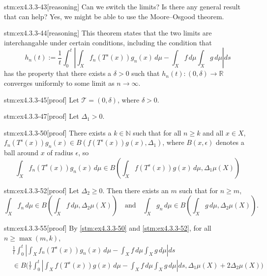 \begin{stm}{stm:ex4.3.3-43}[reasoning]
Can we switch the limits? Is there any general result that can help? Yes, we might be able to use the Moore–Osgood theorem.
\end{stm}

\begin{stm}{stm:ex4.3.3-44}[reasoning]
This theorem states that the two limits are interchangable under certain conditions, including the condition that
$$
h_n(t) := \frac{1}{t} \int_0^t 
\left| \int_X f_n(T^s(x)) g_n(x) \, d\mu 
- \int_X f \, d\mu \int_X g \, d\mu \right| ds
$$
has the property that there exists a $\delta > 0$ such that $h_n(t): (0,\delta) \rightarrow \mathbb{R}$ converges uniformly to some limit as $n \rightarrow \infty$.
\end{stm}

\begin{stm}{stm:ex4.3.3-45}[proof]
Let $\mathcal{T} = (0,\delta)$, where $\delta > 0$.
\end{stm}

\begin{stm}{stm:ex4.3.3-47}[proof]
Let $\Delta_1 > 0$.
\end{stm}

\begin{stm}{stm:ex4.3.3-50}[proof]
There exists a $ k \in \mathbb{N}$ such that for all $ n \geq k $ and all $x \in X$, $f_n(T^s(x)) g_n(x) \in B(f(T^s(x)) g(x), \Delta_1)$, where $B(x,\epsilon)$ denotes a ball around $x$ of radius $\epsilon$, so
\[
\int_X f_n(T^s(x)) g_n(x) \, d\mu 
\in B \left( \int_X f(T^s(x)) g(x) \, d\mu, \Delta_1 \mu(X) \right)
\]
\end{stm}

\begin{stm}{stm:ex4.3.3-52}[proof]
Let $\Delta_2 \geq 0$. Then there exists an $m$ such that for $n \geq m$,
\[
\int_X f_n \, d\mu \in B \left( \int_X f \, d\mu, \Delta_2 \mu(X) \right)
\quad \text{and} \quad 
\int_X g_n \, d\mu \in B \left( \int_X g \, d\mu, \Delta_2 \mu(X) \right).
\]
\end{stm}

\begin{stm}{stm:ex4.3.3-55}[proof]
By \ref{stm:ex4.3.3-50} and \ref{stm:ex4.3.3-52}, for all $n \geq \max(m,k)$,
\begin{align*}
&\frac{1}{t} \int_0^t \left| \int_X f_n(T^s(x)) g_n(x) \, d\mu 
- \int_X f \, d\mu \int_X g \, d\mu \right| ds \\
&\in B \Big( \frac{1}{t} \int_0^t \left| \int_X f(T^s(x)) g(x) \, d\mu 
- \int_X f \, d\mu \int_X g \, d\mu \right| ds, \Delta_1 \mu(X) + 2 \Delta_2 \mu(X) \Big)
\end{align*}
\end{stm}

